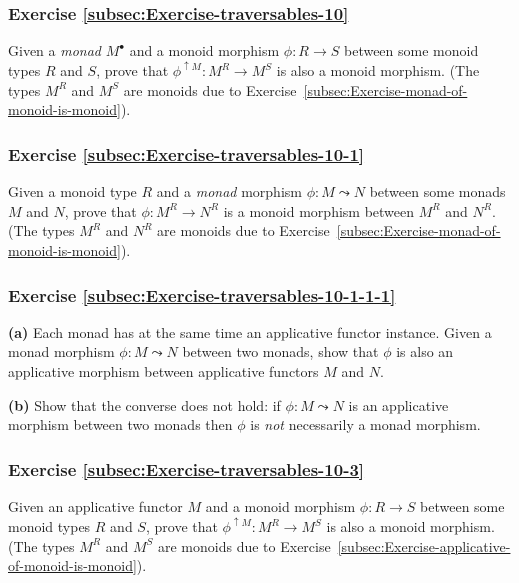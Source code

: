 \subsubsection{Exercise \label{subsec:Exercise-traversables-10}\ref{subsec:Exercise-traversables-10}}

Given a \emph{monad} $M^{\bullet}$ and a monoid morphism $\phi:R\rightarrow S$
between some monoid types $R$ and $S$, prove that $\phi^{\uparrow M}:M^{R}\rightarrow M^{S}$
is also a monoid morphism. (The types $M^{R}$ and $M^{S}$ are monoids
due to Exercise~\ref{subsec:Exercise-monad-of-monoid-is-monoid}).

\subsubsection{Exercise \label{subsec:Exercise-traversables-10-1}\ref{subsec:Exercise-traversables-10-1}}

Given a monoid type $R$ and a \emph{monad} morphism $\phi:M\leadsto N$
between some monads $M$ and $N$, prove that $\phi:M^{R}\rightarrow N^{R}$
is a monoid morphism between $M^{R}$ and $N^{R}$. (The types $M^{R}$
and $N^{R}$ are monoids due to Exercise~\ref{subsec:Exercise-monad-of-monoid-is-monoid}).

\subsubsection{Exercise \label{subsec:Exercise-traversables-10-1-1-1}\ref{subsec:Exercise-traversables-10-1-1-1}}

\textbf{(a)} Each monad has at the same time an applicative functor
instance. Given a monad morphism $\phi:M\leadsto N$ between two monads,
show that $\phi$ is also an applicative morphism between applicative
functors $M$ and $N$.

\textbf{(b)} Show that the converse does not hold: if $\phi:M\leadsto N$
is an applicative morphism between two monads then $\phi$ is \emph{not}
necessarily a monad morphism.

\subsubsection{Exercise \label{subsec:Exercise-traversables-10-3}\ref{subsec:Exercise-traversables-10-3}}

Given an applicative functor $M$ and a monoid morphism $\phi:R\rightarrow S$
between some monoid types $R$ and $S$, prove that $\phi^{\uparrow M}:M^{R}\rightarrow M^{S}$
is also a monoid morphism. (The types $M^{R}$ and $M^{S}$ are monoids
due to Exercise~\ref{subsec:Exercise-applicative-of-monoid-is-monoid}).

